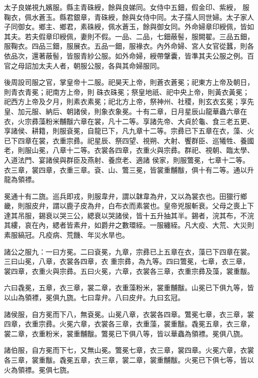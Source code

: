 \begin{pinyinscope}
 太子良娣視九嬪服。縣主青硃綬，餘與良娣同。女侍中五鈿，假金印、紫綬，
 服鞠衣，佩水蒼玉。縣君銀章，青硃綬，餘與女侍中同。太子孺人同世婦。太子家人子同御女。鄉主、鄉君，素硃綬，佩水蒼玉，餘與御女同。外命婦章印綬佩，皆如其夫。若夫假章印綬佩，妻則不假。一品、二品，七鈿蔽髻，服闕翟。三品五鈿，服鞠衣。四品三鈿，服展衣。五品一鈿，服褖衣。內外命婦、宮人女官從蠶，則各依品次，還著蔽髻，皆服青紗公服。如外命婦，綬帶鞶囊，皆準其夫公服之例。百官之母詔加太夫人者，朝服公服，各與其命婦服同。



 後周設司服之官，掌皇帝十二服。祀昊天上帝，則蒼衣蒼冕；祀東方上帝及朝日，則青衣青冕；祀南方上帝，則
 硃衣硃冕；祭皇地祇、祀中央上帝，則黃衣黃冕；祀西方上帝及夕月，則素衣素冕；祀北方上帝，祭神州、社稷，則玄衣玄冕；享先皇、加元服、納后、朝諸侯，則象衣象冕。十有二章，日月星辰山龍華蟲六章在衣，火宗彞藻粉米黼黻六章在裳，凡十二等。享諸先帝、大貞於龜、食三老五更、享諸侯、耕籍，則服袞冕，自龍已下，凡九章十二等。宗彞已下五章在衣，藻、火已下四章在裳，衣重宗彞。祀星辰、祭四望、視朔、大射、饗群臣、巡犧牲、養國老，則服山冕，八章十二等。衣裳各四章，衣重火與宗彞。群祀、視朝、臨太學、入道法門、宴諸侯與群臣及燕射、養庶老、適諸
 侯家，則服鷩冕，七章十二等。衣三章，裳四章，衣重三章。袞、山、鷩三冕，皆裳重黼黻，俱十有二等。通以升龍為領褾。



 冕通十有二旒。巡兵即戎，則服韋弁，謂以韎韋為弁，又以為裳衣也。田獵行鄉畿，則服皮弁，謂以鹿子皮為弁，白布衣而素裳也。皇帝兇服斬衰。父母之喪上下達其吊服，錫衰以哭三公，緦衰以哭諸侯，皆十五升抽其半。錫者，浣其布，不浣其縷，哀在內，緦者皆素弁，如爵弁之數環絰。一服纏絰。凡大疫、大荒、大災則素服縞冠。凡疫病、荒饑、年災水旱也。



 諸公之服九：一曰方冕。二曰袞冕，九章，宗彞已上五章在衣，藻已下四章在裳。三曰山冕，八章，衣裳各四章，衣
 重宗彞，為九等。四曰鷩冕，七章，衣三章，裳四章，衣重火與宗彞。五曰火冕，六章，衣裳各三章，衣重宗彞及藻，裳重黻。



 六曰毳冕，五章，衣三章，裳二章，衣重藻粉米，裳重黼黻。山冕已下俱九等，皆以山為領褾，冕俱九旒。七曰韋弁。八曰皮弁。九曰玄冠。



 諸侯服，自方冕而下八，無袞冕。山冕八章，衣裳各四章。鷩冕七章，衣三章，裳四章，衣重宗彞。火冕六章，衣裳各三章，衣重藻，裳重黻。毳冕五章，衣三章，裳二章，衣重粉米，裳重黼黻。鷩冕已下俱八等，皆以華蟲為領褾。冕俱八旒。



 諸伯服，自方冕而下七，又無山冕。鷩冕七章，衣三章，裳四章。火冕六章，衣裳各三章，裳重黻。毳冕五章，衣三章，裳二章，裳重黼黻。火冕已下俱七等，皆以火為領褾。冕俱七旒。




\end{pinyinscope}
